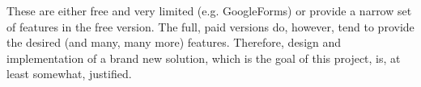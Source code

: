 These are either free and very limited (e.g. GoogleForms) or provide a narrow set of features in the free version. The full, paid versions do, however, tend to provide the desired (and many, many more) features. Therefore, design and implementation of a brand new solution, which is the goal of this project, is, at least somewhat, justified.
